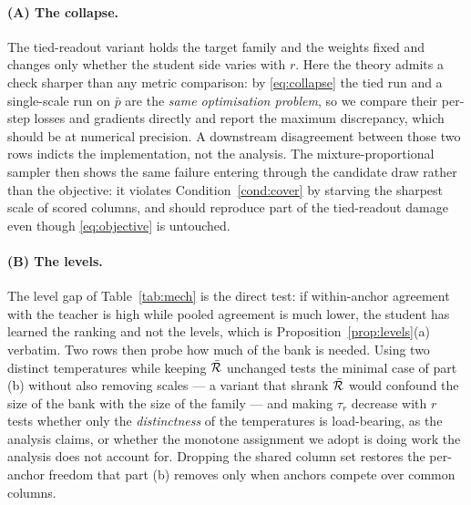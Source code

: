 

\paragraph{(A) The collapse.}
The tied-readout variant holds the target family and the weights fixed and changes only
whether the student side varies with $r$. Here the theory admits a check sharper than any
metric comparison: by \eqref{eq:collapse} the tied run and a single-scale run on $\bar p$
are the \emph{same optimisation problem}, so we compare their per-step losses and gradients
directly and report the maximum discrepancy, which should be at numerical precision. A
downstream disagreement between those two rows indicts the implementation, not the analysis.
The mixture-proportional sampler then shows the same failure entering through the candidate
draw rather than the objective: it violates Condition~\ref{cond:cover} by starving the
sharpest scale of scored columns, and should reproduce part of the tied-readout damage even
though \eqref{eq:objective} is untouched.

\paragraph{(B) The levels.}
The level gap of Table~\ref{tab:mech} is the direct test: if within-anchor agreement with
the teacher is high while pooled agreement is much lower, the student has learned the
ranking and not the levels, which is Proposition~\ref{prop:levels}(a) verbatim. Two rows
then probe how much of the bank is needed. Using two distinct temperatures while keeping
$\bar{\mathcal{R}}$ unchanged tests the minimal case of part (b) without also removing scales --- a
variant that shrank $\bar{\mathcal{R}}$ would confound the size of the bank with the size of the family
--- and making $\tau_r$ decrease with $r$ tests whether only the \emph{distinctness} of the
temperatures is load-bearing, as the analysis claims, or whether the monotone assignment we
adopt is doing work the analysis does not account for. Dropping the shared column set
restores the per-anchor freedom that part (b) removes only when anchors compete over common
columns.

